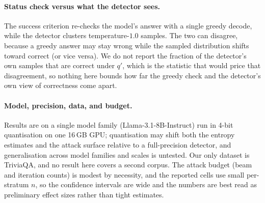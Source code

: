\paragraph{Status check versus what the detector sees.}
The success criterion re-checks the model's answer with a single greedy decode, while the
detector clusters temperature-$1.0$ samples. The two can disagree, because a greedy answer may
stay wrong while the sampled distribution shifts toward correct (or vice versa). We do not
report the fraction of the detector's own samples that are correct under $q'$, which is the
statistic that would price that disagreement, so nothing here bounds how far the greedy check
and the detector's own view of correctness come apart.

\paragraph{Model, precision, data, and budget.}
Results are on a single model family (Llama-3.1-8B-Instruct) run in 4-bit quantisation on one
16\,GB GPU; quantisation may shift both the entropy estimates and the attack surface relative
to a full-precision detector, and generalisation across model families and scales is untested.
Our only dataset is TriviaQA, and no result here covers a second corpus. The attack
budget (beam and iteration counts) is modest by necessity, and the reported cells use small
per-stratum $n$, so the confidence intervals are wide and the numbers are best read as
preliminary effect sizes rather than tight estimates.

